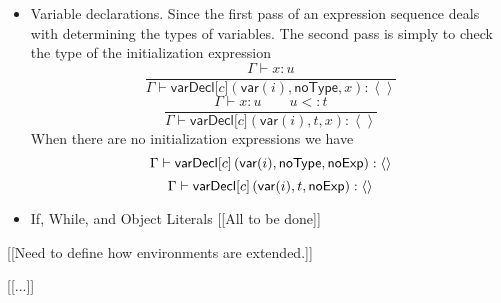 \documentclass[12pt]{article}
\begin{document}
\begin{itemize}
\item Variable declarations. Since the first pass of an expression sequence
deals with determining the types of variables. The second pass is simply to
check the type of the initialization expression%
\begin{equation*}
\frac{\Gamma \vdash x:u}{\Gamma \vdash \mathsf{varDecl[}c\mathsf{]}\left( 
\mathsf{var}(i),\mathsf{noType},x\right) :\left\langle {}\right\rangle }
\end{equation*}%
\begin{equation*}
\frac{\Gamma \vdash x:u\qquad u<:t}{\Gamma \vdash \mathsf{varDecl[}c\mathsf{]%
}\left( \mathsf{var}(i),t,x\right) :\left\langle {}\right\rangle }
\end{equation*}%
When there are no initialization expressions we have%
\begin{equation*}
\Gamma \vdash \mathsf{varDecl[}c\mathsf{]}\left( \mathsf{var}(i),\mathsf{%
noType},\mathsf{noExp}\right) :\left\langle {}\right\rangle 
\end{equation*}%
\begin{equation*}
\Gamma \vdash \mathsf{varDecl[}c\mathsf{]}\left( \mathsf{var}(i),t,\mathsf{%
noExp}\right) :\left\langle {}\right\rangle 
\end{equation*}

\item If, While, and Object Literals [[All to be done]]
\end{itemize}

[[Need to define how environments are extended.]]

[[...]]
\end{document}
